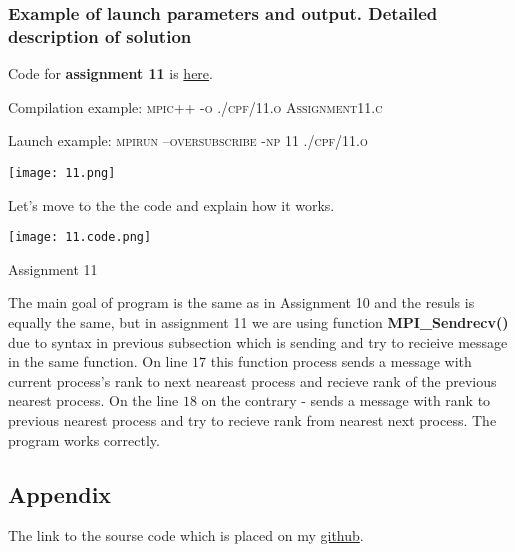 \documentclass[%
12pt, %
final, %
oneside, %
onecolumn, %
centertags]{article} %
\theoremstyle{plain}
\theoremstyle{definition}
\theoremstyle{remark}
\begin{document}
\subsubsection{Example of launch parameters and output. Detailed description of solution}

Code for \textbf{assignment 11} is \href{https:\//github.com/aptmess/parallel_algorithms/blob/master/HT/hw_mpi/Assignment11.c}{here}.

Compilation example: \textsc{mpic++ -o ./cpf/11.o Assignment11.c}

Launch example: \textsc{mpirun --oversubscribe -np 11 ./cpf/11.o}

\begin{center}
\texttt{[image: 11.png]}
\end{center}

Let's move to the the code and explain how it works.

\begin{center}
\texttt{[image: 11.code.png]}

Assignment 11
\end{center}

The main goal of program is the same as in Assignment 10 and the resuls is equally the same, but in assignment 11 we are using function \textbf{MPI\_Sendrecv()} due to syntax in previous subsection which is sending and try to recieive message in the same function. On line $17$ this function process sends a message with current process's rank to next neareast process and recieve rank of the previous nearest process. On the line $18$ on the contrary - sends a message with rank to previous nearest process and try to recieve rank from nearest next process. The program works correctly.


\subsection{Appendix}

The link to the sourse code which is placed on my \href{https://github.com/aptmess/parallel_algorithms}{github}.
\end{document}
